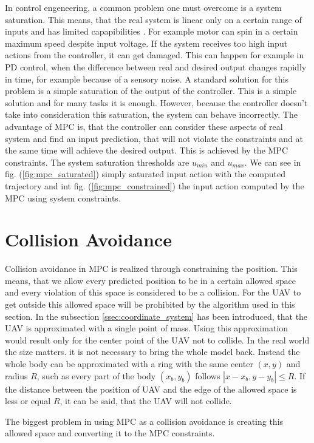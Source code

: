 \documentclass[a4paper,11pt,titlepage]{article}
\begin{document}
In control engeneering, a common problem one must overcome is a system saturation. This means, that the real system is linear only on a certain range of inputs and has limited capapibilities \cite{saturation}. For example motor can spin in a certain maximum speed despite input voltage. If the system receives too high input actions from the controller, it can get damaged. This can happen for example in PD control, when the difference between real and desired output changes rapidly in time, for example because of a sensory noise.
A standard  solution for this problem is a simple saturation of the output of the controller. This is a simple solution and for many tasks it is enough. However, because the controller doesn't take into consideration this saturation, the system can behave incorrectly.
The advantage of MPC is, that the controller can consider these aspects of real system and find an input prediction, that will not violate the constraints and at the same time will achieve the desired output. This is achieved by the MPC constraints. The system saturation thresholds are $u_{min}$ and $u_{max}$. We can see in fig. (\ref{fig:mpc_saturated}) simply saturated input action with the computed trajectory and int fig. (\ref{fig:mpc_constrained}) the input action computed by the MPC using system constraints. 

\section{Collision Avoidance}
Collision avoidance in MPC is realized through constraining the position. This means, that we allow every predicted position to be in a certain allowed space and every violation of this space is considered to be a collision. For the UAV to get outside this allowed space will be prohibited by the algorithm used in this section. In the subsection \ref{ssec:coordinate_system} has been introduced, that the UAV is approximated with a single point of mass. Using this approximation would result only for the center point of the UAV not to collide. In the real world the size matters. it is not necessary to bring the whole model back. Instead the whole body can be approximated with a ring with the same center $(x, y)$ and radius $R$, such as every part of the body $(x_b, y_b)$ follows $|x - x_b, y - y_b| \leq R$. If the distance between the position of UAV and the edge of the allowed space is less or equal $R$, it can be said, that the UAV will not collide. 

The biggest problem in using MPC as a collision avoidance is creating this allowed space and converting it to the MPC constraints. 
\end{document}
